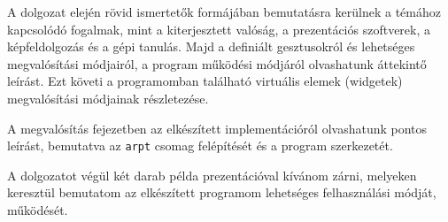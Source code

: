 A dolgozat elején rövid ismertetők formájában bemutatásra kerülnek a témához kapcsolódó fogalmak, mint a kiterjesztett valóság, a prezentációs szoftverek, a képfeldolgozás és a gépi tanulás. Majd a definiált gesztusokról és lehetséges megvalósítási módjairól, a program működési módjáról olvashatunk áttekintő leírást. Ezt követi a programomban található virtuális elemek (widgetek) megvalósítási módjainak részletezése.

A megvalósítás fejezetben az elkészített implementációról olvashatunk pontos leírást, bemutatva az \texttt{arpt} csomag felépítését és a program szerkezetét.

A dolgozatot végül két darab példa prezentációval kívánom zárni, melyeken keresztül bemutatom az elkészített programom lehetséges felhasználási módját, működését.
